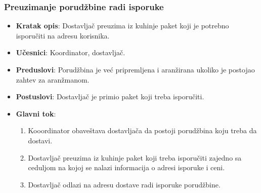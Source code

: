 \subsubsection{Preuzimanje porudžbine radi isporuke}
\begin{itemize}
    \item \textbf{Kratak opis}:
    Dostavljač preuzima iz kuhinje paket koji je potrebno isporučiti na adresu korisnika.
    \item \textbf{Učesnici}: 
    Koordinator, dostavljač.
    \item \textbf{Preduslovi}:
    Porudžbina je već pripremljena i aranžirana ukoliko je postojao zahtev za aranžmanom.
    \item \textbf{Postuslovi}:
    Dostavljač je primio paket koji treba isporučiti.
    \item \textbf{Glavni tok}:
   \begin{enumerate}
        \item Kooordinator obaveštava
        dostavljača da postoji porudžbina koju 
        treba da dostavi.
        \item Dostavljač preuzima iz kuhinje paket koji treba isporučiti zajedno sa ceduljom na kojoj se nalazi informacija o adresi isporuke i ceni.
        \item Dostavljač odlazi na adresu dostave radi isporuke porudžbine.
\end{enumerate}
\end{itemize}
 
